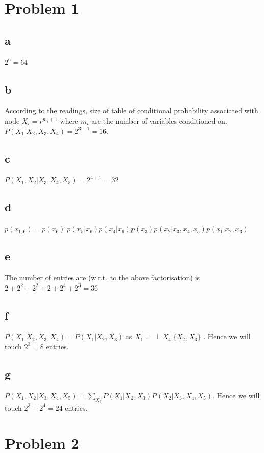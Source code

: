 \documentclass[twoside]{homework}
\begin{document}
\maketitle

\section*{Problem 1}
\subsection*{a}
$2^6 = 64$
\subsection*{b}
According to the readings, size of table of conditional probability associated with node $X_i = r^{m_i + 1}$ where $m_i$ are the number of variables conditioned on. $P(X_1 | X_2, X_3, X_4) = 2^{3+1} = 16$.
\subsection*{c}
$P(X_1, X_2 | X_3, X_4, X_5) = 2^{4+1} = 32$
\subsection*{d}
$p(x_{1:6}) = p(x_6).p(x_5 | x_6) p(x_4 | x_6) p(x_3) p(x_2 | x_3, x_4, x_5) p(x_1 | x_2, x_3)$
\subsection*{e}
The number of entries are (w.r.t. to the above factorisation) is $2 + 2^2 + 2^2 + 2 + 2^4 + 2^3 = 36$
\subsection*{f}
$P(X_1 | X_2, X_3, X_4)  = P(X_1 | X_2, X_3)$ as $X_1 \!\perp\!\!\!\perp X_4 | \{X_2, X_3\}$ . Hence we will touch $2^3 = 8$ entries.
\subsection*{g}
$P(X_1, X_2 | X_3, X_4, X_5)  = \sum_{X_3} P(X_1 | X_2, X_3) P(X_2 | X_3, X_4, X_5)$. Hence we will touch $2^3 +2 ^4 = 24$ entries.

\section*{Problem 2}
\end{document}
